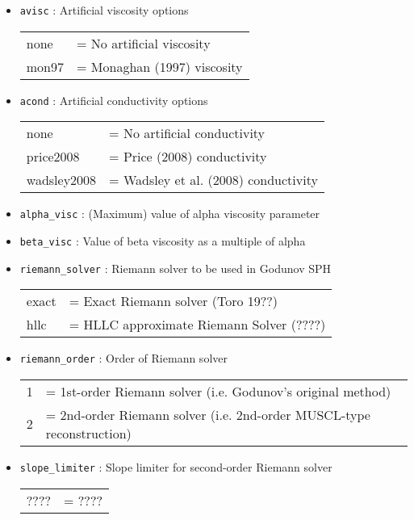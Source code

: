 \documentclass[a4paper]{article}
\newcommand{\var}[1]{\texttt{#1}}
\begin{document}
\begin{itemize}


\item \var{avisc} : Artificial viscosity options \\
\begin{tabular}{ll}
none  & = No artificial viscosity \\
mon97 & = Monaghan (1997) viscosity
\end{tabular}

\item \var{acond} : Artificial conductivity options \\
\begin{tabular}{ll}
none        & = No artificial conductivity \\
price2008   & = Price (2008) conductivity \\
wadsley2008 & = Wadsley et al. (2008) conductivity
\end{tabular}

\item \var{alpha\_visc} : (Maximum) value of alpha viscosity parameter

\item \var{beta\_visc} : Value of beta viscosity as a multiple of alpha


\item \var{riemann\_solver} : Riemann solver to be used in Godunov SPH \\
\begin{tabular}{ll}
exact  & = Exact Riemann solver (Toro 19??) \\
hllc   & = HLLC approximate Riemann Solver (????)
\end{tabular}

\item \var{riemann\_order} : Order of Riemann solver \\
\begin{tabular}{ll}
1  & = 1st-order Riemann solver (i.e. Godunov's original method) \\
2  & = 2nd-order Riemann solver (i.e. 2nd-order MUSCL-type reconstruction)
\end{tabular}

\item \var{slope\_limiter} : Slope limiter for second-order Riemann solver \\
\begin{tabular}{ll}
????     & = ???? \\
\end{tabular}




\end{itemize}
\end{document}

